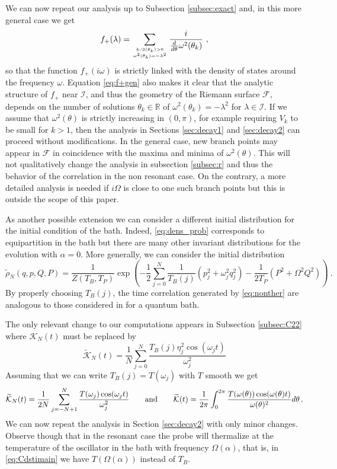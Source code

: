 \documentclass[11pt]{article}
\numberwithin{equation}{section}
\def\red{\textcolor{red}}
\def\red{}
\numberwithin{theorem}{section}
\def\tilde#1{\widetilde{#1}}
\begin{document}
We can now repeat our analysis up to Subsection \ref{subsec:exact} and, in this more general case we get
\begin{equation}\label{eq:f+gen}
 f_+(\lambda)=\sum_{\genfrac{}{}{0pt}{2}{k:\Im(\theta_k)>0}{ 
 \omega^2(\theta_k)=-\lambda^2}}\frac{i}{\tfrac{d}{d\theta}\omega^2(\theta_k)}\ ,
\end{equation}
so that the function $f_+(i\omega)$ is strictly linked with the density of states around the frequency $\omega$.
Equation \eqref{eq:f+gen} also makes it clear that the analytic structure of $f_+$ near $\mathcal I$, and thus the
geometry of the Riemann surface $\mathcal F$, depends on the number of solutions $\theta_k\in\mathds R$ of
$\omega^2(\theta_k)=-\lambda^2$ for $\lambda\in\mathcal I$. If we assume that $\omega^2(\theta)$ is strictly increasing
in $(0,\pi)$, for example requiring $V_k$ to be small for $k>1$, then the analysis in Sections \ref{sec:decay1} and
\ref{sec:decay2} can proceed without modifications. In the general case, new branch points may appear in $\mathcal
F$ in coincidence with the maxima and minima of $\omega^2(\theta)$. This will not qualitatively change the analysis in 
subsection \ref{subsec:r} and thus the behavior of the correlation in the non resonant case. On the contrary, a more 
detailed analysis is needed if $i\Omega$ is close to one such branch points but this is outside the scope of this 
paper.

\medskip

\red{As another possible extension we can consider a different initial distribution for the initial condition of the bath. Indeed, \eqref{eq:dens_prob} corresponds to equipartition in the bath but there 
are many other invariant distributions for the evolution with $\alpha=0$. More generally, we can consider the initial 
distribution
\begin{equation}\label{eq:nonther}
\tilde\rho_{N}(q,p,Q,P)=\frac{1}{Z(T_B,T_P)} \exp\left(-\frac12\sum_{j=0}^N\frac 1{T_B(j)}
(p_j^2+\omega_j^2 q_j^2)-\frac 1{2T_P} (P^2+\Omega^2Q^2)\right)\ .
\end{equation}
By properly choosing $T_B(j)$, the time correlation generated by \eqref{eq:nonther} are analogous to those considered 
in \cite{Das} for a quantum bath.}

\red{The only relevant change to our computations appears in Subsection \ref{subsec:C22} 
where 
${\mathcal K}_N(t)$ must be replaced by
\[
\widetilde{\mathcal K}_N(t)=\frac{1}{N}\sum_{j=0}^N 
\frac{T_B(j)\eta_j^2\cos(\omega_jt)}{\omega_j^2}
\]
Assuming that we can write $T_B(j)=T(\omega_j)$ with $T$ smooth we get
\[
\widetilde{\mathcal K}_N(t)=\frac{1}{2N}\sum_{j=-N+1}^N
\frac{T(\omega_j)\cos(\omega_jt)}{\omega_j^2}\qquad\hbox{and}\qquad
\widetilde{\mathcal K}(t)=\frac{1}{2\pi}\int_0^{2\pi}
\frac{T(\omega(\theta))\cos(\omega(\theta)t)}{\omega(\theta)^2}d\theta\, .
\]
We can now repeat the analysis in Section \ref{sec:decay2} with only minor changes. Observe though that in the resonant 
case the probe will thermalize at the temperature of the oscillator in the bath with frequency $\Omega(\alpha)$, that 
is, in \eqref{eq:Cdstimain} we have $T(\Omega(\alpha))$ instead of $T_B$.
}
\end{document}
